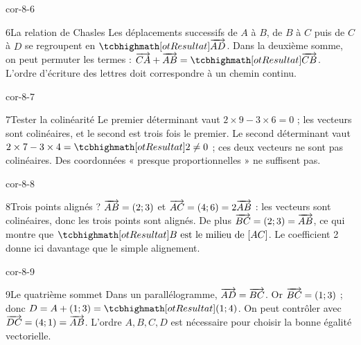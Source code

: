 \begin{blocLivre}{cor-8-6}
\begin{corrige}{6}{La relation de Chasles}
Les déplacements successifs de $A$ à $B$, de $B$ à $C$ puis de $C$ à $D$ se regroupent en $\res{\vect{AD}}$. Dans la deuxième somme, on peut permuter les termes : $\vect{CA}+\vect{AB}=\res{\vect{CB}}$. L’ordre d’écriture des lettres doit correspondre à un chemin continu.
\label{fig-cor-8-6}
\end{corrige}
\end{blocLivre}
\begin{blocLivre}{cor-8-7}
\begin{corrige}{7}{Tester la colinéarité}
Le premier déterminant vaut $2\times9-3\times6=0$ ; les vecteurs sont colinéaires, et le second est trois fois le premier. Le second déterminant vaut $2\times7-3\times4=\res2\ne0$ ; ces deux vecteurs ne sont pas colinéaires. Des coordonnées « presque proportionnelles » ne suffisent pas.
\label{fig-cor-8-7}
\end{corrige}
\end{blocLivre}
\begin{blocLivre}{cor-8-8}
\begin{corrige}{8}{Trois points alignés ?}
$\overrightarrow{AB}=(2;3)$ et $\overrightarrow{AC}=(4;6)=2\overrightarrow{AB}$ : les vecteurs sont colinéaires, donc les trois points sont alignés. De plus $\overrightarrow{BC}=(2;3)=\overrightarrow{AB}$, ce qui montre que $\res{B\text{ est le milieu de }[AC]}$. Le coefficient 2 donne ici davantage que le simple alignement.
\label{fig-cor-8-8}
\end{corrige}
\end{blocLivre}
\begin{blocLivre}{cor-8-9}
\begin{corrige}{9}{Le quatrième sommet}
Dans un parallélogramme, $\overrightarrow{AD}=\overrightarrow{BC}$. Or $\overrightarrow{BC}=(1;3)$ ; donc $D=A+(1;3)=\res{(1;4)}$. On peut contrôler avec $\overrightarrow{DC}=(4;1)=\overrightarrow{AB}$. L’ordre $A,B,C,D$ est nécessaire pour choisir la bonne égalité vectorielle.
\label{fig-cor-8-9}
\end{corrige}
\end{blocLivre}
